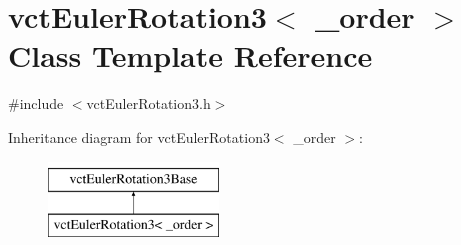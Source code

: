 \hypertarget{classvct_euler_rotation3}{\section{vct\-Euler\-Rotation3$<$ \-\_\-order $>$ Class Template Reference}
\label{classvct_euler_rotation3}
}


{\ttfamily \#include $<$vct\-Euler\-Rotation3.\-h$>$}

Inheritance diagram for vct\-Euler\-Rotation3$<$ \-\_\-order $>$\-:\begin{figure}[H]
\begin{center}
\leavevmode
\includegraphics[height=2.000000cm]{d0/d33/classvct_euler_rotation3}
\end{center}
\end{figure}
